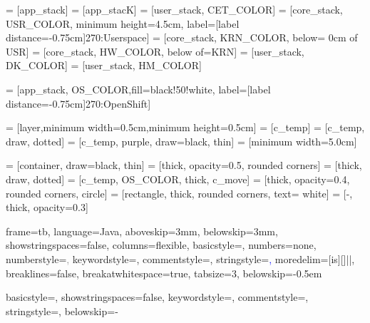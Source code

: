   = [app_stack]
 = [app_stacK]
 = [user_stack, CET_COLOR]
 = [core_stack, USR_COLOR, minimum height=4.5cm, label={[label distance=-0.75cm]270:\color{white}Userspace}]
 = [core_stack, KRN_COLOR, below= 0cm of USR]
  = [core_stack, HW_COLOR, below of=KRN]
  = [user_stack, DK_COLOR]
  = [user_stack, HM_COLOR]

 = [app_stack, OS_COLOR,fill=black!50!white, label={[label distance=-0.75cm]270:OpenShift}]

 = [layer,minimum width=0.5cm,minimum height=0.5cm]
 = [c_temp]
 = [c_temp, draw, dotted]
 = [c_temp, purple, draw=black, thin]
     = [minimum width=5.0cm]

    = [container, draw=black, thin]
  = [thick, opacity=0.5, rounded corners]
   = [thick, draw, dotted] %
= [c_temp, OS_COLOR, thick, c_move]
  = [thick, opacity=0.4, rounded corners, circle]
 = [rectangle, thick, rounded corners, text= white]
 = [-, thick, opacity=0.3]


 {
  frame=tb,
  language=Java,
  aboveskip=3mm,
  belowskip=3mm,
  showstringspaces=false,
  columns=flexible,
  basicstyle={\large\ttfamily},
  numbers=none,
  numberstyle=\textcolor{gray},
  keywordstyle=\textcolor{red!75},
  commentstyle=\textcolor{dkgreen},
  stringstyle=\textcolor{blue},
  moredelim=[is][\textcolor{black!75}]{|}{|},
  breaklines=false,
  breakatwhitespace=true,
  tabsize=3,
  belowskip=-0.5em %
}

 {
  basicstyle=\ttfamily,
  showstringspaces=false,
  keywordstyle=\textcolor{keyword},
  commentstyle=\textcolor{comment},
  stringstyle=\textcolor{string},
  belowskip=-\baselineskip %
}

